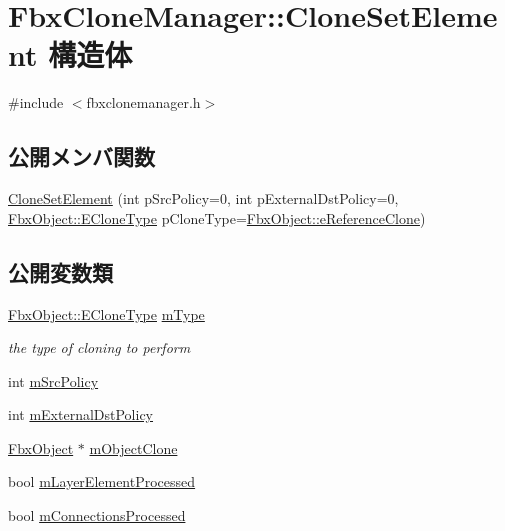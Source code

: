 \hypertarget{struct_fbx_clone_manager_1_1_clone_set_element}{}\section{Fbx\+Clone\+Manager\+:\+:Clone\+Set\+Element 構造体}
\label{struct_fbx_clone_manager_1_1_clone_set_element}


{\ttfamily \#include $<$fbxclonemanager.\+h$>$}

\subsection*{公開メンバ関数}
\begin{DoxyCompactItemize}
\item 
\hyperlink{struct_fbx_clone_manager_1_1_clone_set_element_a28893cc8fb14daf0f134760a6d06a475}{Clone\+Set\+Element} (int p\+Src\+Policy=0, int p\+External\+Dst\+Policy=0, \hyperlink{class_fbx_object_a9f5626b2d2135684d6ea1e6e4ad2acbb}{Fbx\+Object\+::\+E\+Clone\+Type} p\+Clone\+Type=\hyperlink{class_fbx_object_a9f5626b2d2135684d6ea1e6e4ad2acbbae681cda4dccb3f5ccf260e5ccc47d88c}{Fbx\+Object\+::e\+Reference\+Clone})
\end{DoxyCompactItemize}
\subsection*{公開変数類}
\begin{DoxyCompactItemize}
\item 
\hyperlink{class_fbx_object_a9f5626b2d2135684d6ea1e6e4ad2acbb}{Fbx\+Object\+::\+E\+Clone\+Type} \hyperlink{struct_fbx_clone_manager_1_1_clone_set_element_a387497db4d5a0764a947835e5b234393}{m\+Type}
\begin{DoxyCompactList}\small\item\em the type of cloning to perform \end{DoxyCompactList}\item 
int \hyperlink{struct_fbx_clone_manager_1_1_clone_set_element_a0619286ee827ce3e9adcb8914c4af9f1}{m\+Src\+Policy}
\item 
int \hyperlink{struct_fbx_clone_manager_1_1_clone_set_element_aeb430f3dba7d9b522b707c564b04b31d}{m\+External\+Dst\+Policy}
\item 
\hyperlink{class_fbx_object}{Fbx\+Object} $\ast$ \hyperlink{struct_fbx_clone_manager_1_1_clone_set_element_a05f2720efbbcf01591be1f0c770d1004}{m\+Object\+Clone}
\item 
bool \hyperlink{struct_fbx_clone_manager_1_1_clone_set_element_a496dc6c392d9e9db4ef65094bd03d0e5}{m\+Layer\+Element\+Processed}
\item 
bool \hyperlink{struct_fbx_clone_manager_1_1_clone_set_element_a5595fee76a6c3736d11b5c6b2702133b}{m\+Connections\+Processed}
\end{DoxyCompactItemize}


